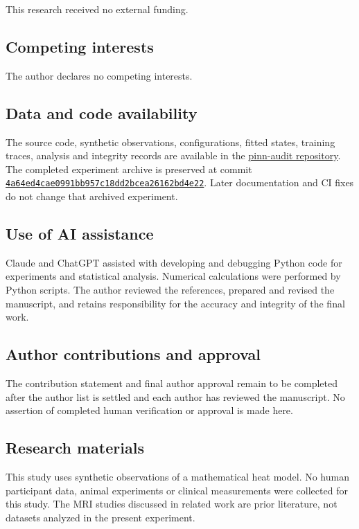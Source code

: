 \documentclass[10pt,a4paper]{article}
\begin{document}
This research received no external funding.

\subsection*{Competing interests}

The author declares no competing interests.

\subsection*{Data and code availability}

The source code, synthetic observations, configurations, fitted states, training
traces, analysis and integrity records are available in the
\href{https://github.com/ridoy1211/pinn-audit}{pinn-audit repository}. The completed
experiment archive is preserved at commit
\href{https://github.com/ridoy1211/pinn-audit/tree/4a64ed4cae0991bb957c18dd2bcea26162bd4e22}{\texttt{4a64ed4cae0991bb957c18dd2bcea26162bd4e22}}.
Later documentation and CI fixes do not change that archived experiment.


\subsection*{Use of AI assistance}

Claude and ChatGPT assisted with developing and debugging Python code for experiments and statistical analysis. Numerical calculations were performed by Python scripts. The author reviewed the references, prepared and revised the manuscript, and retains responsibility for the accuracy and integrity of the final work.
\subsection*{Author contributions and approval}

The contribution statement and final author approval remain to be completed
after the author list is settled and each author has reviewed the manuscript.
No assertion of completed human verification or approval is made here.

\subsection*{Research materials}

This study uses synthetic observations of a mathematical heat model. No human
participant data, animal experiments or clinical measurements were collected
for this study. The MRI studies discussed in related work are prior literature,
not datasets analyzed in the present experiment.
\end{document}
